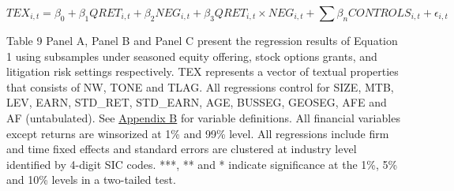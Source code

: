 \begin{table}[H]
\begin{center}
\begin{tabular}{lcccccc}
  		\bottomrule
  		\bottomrule
  	\end{tabular}%
  \end{center}
	\begin{footnotesize}
		\setcounter{equation}{0}
		\begin{equation}
			TEX_{i,t}=\beta_0+\beta_1QRET_{i,t}+\beta_2NEG_{i,t}+\beta_3QRET_{i,t}\times NEG_{i,t}+\sum\beta_nCONTROLS_{i,t}+\epsilon_{i,t}
		\end{equation}
		
		\noindent Table 9 Panel A, Panel B and Panel C present the regression results of Equation 1 using subsamples under seasoned equity offering, stock options grants, and litigation risk settings respectively. TEX represents a vector of textual properties that consists of NW, TONE and TLAG. All regressions control for SIZE, MTB, LEV, EARN, STD\_RET, STD\_EARN, AGE, BUSSEG, GEOSEG, AFE and AF (untabulated). See \hyperref[appb]{Appendix B} for variable definitions. All financial variables except returns are winsorized at 1\% and 99\% level. All regressions include firm and time fixed effects and standard errors are clustered at industry level identified by 4-digit SIC codes. ***, ** and * indicate significance at the 1\%, 5\% and 10\% levels in a two-tailed test. 
	\end{footnotesize}
\end{table}%
